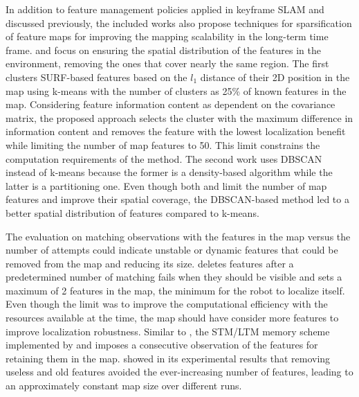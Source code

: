 In addition to feature management policies applied in keyframe SLAM and discussed previously, the included works also propose techniques for sparsification of feature maps for improving the mapping scalability in the long-term time frame.
\cite{hochdorfer-schlegel:2009} and \cite{hochdorfer-et-al:2009:5339626} focus on ensuring the spatial distribution of the features in the environment, removing the ones that cover nearly the same region.
The first clusters SURF-based features based on the $l_1$ distance of their 2D position in the map using k-means with the number of clusters as 25\% of known features in the map. Considering feature information content as dependent on the covariance matrix, the proposed approach selects the cluster with the maximum difference in information content and removes the feature with the lowest localization benefit while limiting the number of map features to 50. This limit constrains the computation requirements of the method. The second work uses DBSCAN instead of k-means because the former is a density-based algorithm while the latter is a partitioning one. Even though both \cite{hochdorfer-schlegel:2009} and \cite{hochdorfer-et-al:2009:5339626} limit the number of map features and improve their spatial coverage, the DBSCAN-based method led to a better spatial distribution of features compared to k-means.

The evaluation on matching observations with the features in the map versus the number of attempts could indicate unstable or dynamic features that could be removed from the map and reducing its size.
\cite{davison-murray:2002:1017615} deletes features after a predetermined number of matching fails when they should be visible and sets a maximum of 2 features in the map, the minimum for the robot to localize itself. Even though the limit was to improve the computational efficiency with the resources available at the time, the map should have consider more features to improve localization robustness.
Similar to \cite{davison-murray:2002:1017615}, the STM/LTM memory scheme implemented by \cite{dayoub-et-al:2011:013} and \cite{bacca-et-al:2013:003} imposes a consecutive observation of the features for retaining them in the map. \cite{bacca-et-al:2013:003} showed in its experimental results that removing useless and old features avoided the ever-increasing number of features, leading to an approximately constant map size over different runs.

